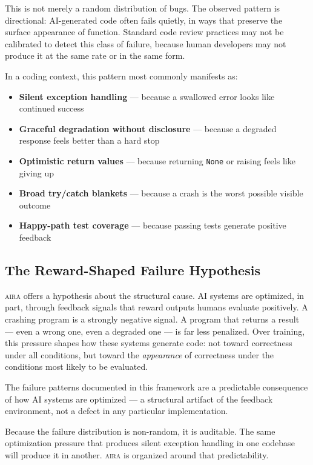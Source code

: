 \documentclass[11pt]{article}
\newenvironment{quotebox}{%
  \begin{tcolorbox}[
    enhanced,
    colback=aira-light,
    colframe=aira-mid,
    leftrule=4pt, rightrule=0pt, toprule=0pt, bottomrule=0pt,
    arc=0pt,
    left=6pt, right=6pt, top=4pt, bottom=4pt
  ]
  \itshape
}{%
  \end{tcolorbox}
}
\newcommand{\aira}{\textsc{aira}}
\begin{document}
This is not merely a random distribution of bugs. The observed pattern is directional:
AI-generated code often fails quietly, in ways that preserve the surface appearance of
function. Standard code review practices may not be calibrated to detect this class of
failure, because human developers may not produce it at the same rate or in the same form.

In a coding context, this pattern most commonly manifests as:
\begin{itemize}
  \item \textbf{Silent exception handling} --- because a swallowed error looks like continued
        success
  \item \textbf{Graceful degradation without disclosure} --- because a degraded response feels
        better than a hard stop
  \item \textbf{Optimistic return values} --- because returning \texttt{None} or raising feels
        like giving up
  \item \textbf{Broad try/catch blankets} --- because a crash is the worst possible visible
        outcome
  \item \textbf{Happy-path test coverage} --- because passing tests generate positive feedback
\end{itemize}

\subsection{The Reward-Shaped Failure Hypothesis}

\aira{} offers a hypothesis about the structural cause. AI systems are optimized, in part,
through feedback signals that reward outputs humans evaluate positively. A crashing program
is a strongly negative signal. A program that returns a result --- even a wrong one, even a
degraded one --- is far less penalized. Over training, this pressure shapes how these systems
generate code: not toward correctness under all conditions, but toward the \emph{appearance}
of correctness under the conditions most likely to be evaluated.

\begin{quotebox}
The failure patterns documented in this framework are a predictable consequence of how AI
systems are optimized --- a structural artifact of the feedback environment, not a defect
in any particular implementation.
\end{quotebox}

Because the failure distribution is non-random, it is auditable. The same optimization
pressure that produces silent exception handling in one codebase will produce it in another.
\aira{} is organized around that predictability.
\end{document}

